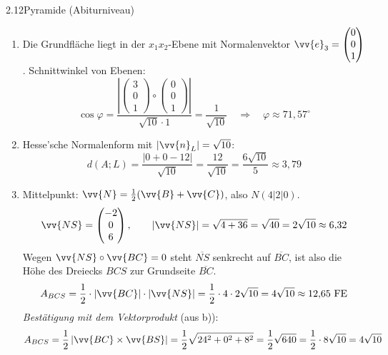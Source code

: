 \begin{loesung}{2.12}{Pyramide (Abiturniveau)}
\begin{enumerate}[label=\alph*)]
  \item Die Grundfläche liegt in der $x_1x_2$-Ebene mit Normalenvektor $\vv{e}_3 = \begin{pmatrix} 0\\ 0\\ 1\end{pmatrix}$. Schnittwinkel von Ebenen:
  \[\cos{\varphi} = \dfrac{\left|\begin{pmatrix} 3\\ 0\\ 1\end{pmatrix}\circ\begin{pmatrix} 0\\ 0\\ 1\end{pmatrix}\right|}{\sqrt{10}\cdot 1} = \dfrac{1}{\sqrt{10}}\quad\Longrightarrow\quad\varphi\approx 71{,}57^{\circ}\]
  \item Hesse'sche Normalenform mit $|\vv{n}_L| = \sqrt{10}$:
  \[d(A;L) = \dfrac{|0+0-12|}{\sqrt{10}} = \dfrac{12}{\sqrt{10}} = \dfrac{6\sqrt{10}}{5}\approx 3{,}79\]
  \item Mittelpunkt: $\vv{N} = \frac{1}{2}(\vv{B}+\vv{C})$, also $N(4|2|0)$.
  \[\vv{NS} = \begin{pmatrix} -2\\ 0\\ 6\end{pmatrix},\qquad |\vv{NS}| = \sqrt{4+36} = \sqrt{40} = 2\sqrt{10}\approx 6{,}32\]
  Wegen $\vv{NS}\circ\vv{BC} = 0$ steht $\overline{NS}$ senkrecht auf $\overline{BC}$, ist also die Höhe des Dreiecks $BCS$ zur Grundseite $\overline{BC}$.
  \[A_{BCS} = \dfrac{1}{2}\cdot|\vv{BC}|\cdot|\vv{NS}| = \dfrac{1}{2}\cdot 4\cdot 2\sqrt{10} = 4\sqrt{10}\approx 12{,}65\ \text{FE}\]
  \textit{Bestätigung mit dem Vektorprodukt} (aus b)):
  \[A_{BCS} = \dfrac{1}{2}\left|\vv{BC}\times\vv{BS}\right| = \dfrac{1}{2}\sqrt{24^2+0^2+8^2} = \dfrac{1}{2}\sqrt{640} = \dfrac{1}{2}\cdot 8\sqrt{10} = 4\sqrt{10}\]
\end{enumerate}
\end{loesung}


